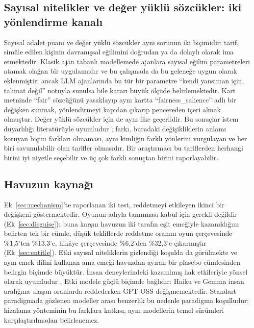 \documentclass[11pt]{article}
\begin{document}
\subsection{Sayısal nitelikler ve değer yüklü sözcükler: iki yönlendirme kanalı}

Sayısal adalet puanı ve değer yüklü sözcükler aynı sorunun iki biçimidir: tarif, simüle edilen kişinin davranışsal eğilimini doğrudan ya da dolaylı olarak ima etmektedir. Klasik ajan tabanlı modellemede ajanlara sayısal eğilim parametreleri atamak olağan bir uygulamadır ve bu çalışmada da bu geleneğe uygun olarak eklenmiştir; ancak LLM ajanlarında bu tür bir parametre ``kendi yansıman için, talimat değil'' notuyla sunulsa bile kararı büyük ölçüde belirlemektedir. Kart metninde ``fair'' sözcüğünü yasaklayıp aynı kartta ``fairness\_salience'' adlı bir değişken sunmak, yönlendirmeyi kapıdan çıkarıp pencereden içeri almak olmuştur. Değer yüklü sözcükler için de aynı ilke geçerlidir. Bu sonuçlar istem duyarlılığı literatürüyle uyumludur \citep{sclar2024quantifying}; farkı, buradaki değişikliklerin anlamı koruyan biçim farkları olmaması, aynı kimliğin farklı yönlerini vurgulayan ve her biri savunulabilir olan tarifler olmasıdır. Bir araştırmacı bu tariflerden herhangi birini iyi niyetle seçebilir ve üç çok farklı sonuçtan birini raporlayabilir.

\subsection{Havuzun kaynağı}\label{sec:source}

Ek~\ref{sec:mechanism}'te raporlanan iki test, reddetmeyi etkileyen ikinci bir değişkeni göstermektedir. Oyunun adıyla tanınması kabul için gerekli değildir (Ek~\ref{sec:disguise}); buna karşın havuzun iki tarafın eşit emeğiyle kazanıldığını belirten tek bir cümle, düşük tekliflerde reddetme oranını oyun çerçevesinde \%1,5'ten \%13,3'e, hikâye çerçevesinde \%6,2'den \%32,3'e çıkarmıştır (Ek~\ref{sec:entitle}). Etki sayısal niteliklerin gizlendiği koşulda da görülmekte ve aynı emek dilini kullanan ama emeği havuzdan ayıran bir plasebo cümlesinden belirgin biçimde büyüktür. İnsan deneylerindeki kazanılmış hak etkileriyle yönsel olarak uyumludur \citep{hoffman1994,cherry2002,oxoby2008}. Etki modele güçlü biçimde bağlıdır: Haiku ve Gemma insan aralığına ulaşan oranlarda reddederken GPT-OSS değişmemektedir. Standart paradigmada gözlenen modeller arası benzerlik bu nedenle paradigma koşulludur; hizalama yönteminin bu farklara katkısı, aynı modellerin temel sürümleri karşılaştırılmadan belirlenemez.
\end{document}
